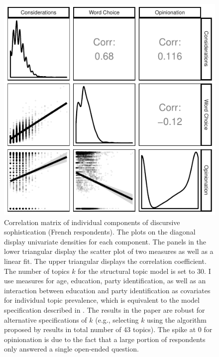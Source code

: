 \documentclass[12pt]{article}
\begin{document}
\begin{figure}[h]\centering
\includegraphics{../fig/swiss_corplot_french_components.pdf}
\caption{Correlation matrix of individual components of discursive sophistication (French respondents). The plots on the diagonal display univariate densities for each component. The panels in the lower triangular display the scatter plot of two measures as well as a linear fit. The upper triangular displays the correlation coefficient. The number of topics $k$ for the structural topic model is set to 30. I use measures for age, education, party identification, as well as an interaction between education and party identification as covariates for individual topic prevalence, which is equivalent to the model specification described in \citet{roberts2014structural}. The results in the paper are robust for alternative specifications of $k$ (e.g., selecting $k$ using the algorithm proposed by \citet{lee2014low} results in total number of 43 topics). The spike at 0 for opinionation is due to the fact that a large portion of respondents only answered a single open-ended question.}\label{fig:swiss_french_components}
\end{figure}
\end{document}
